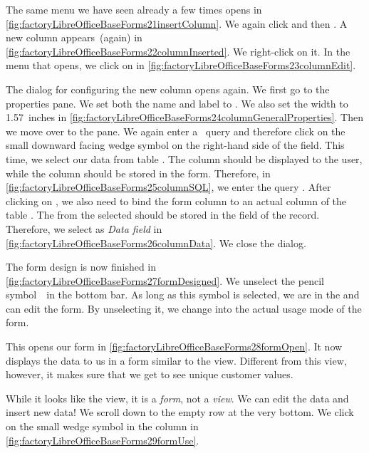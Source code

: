 The same menu we have seen already a few times opens in \cref{fig:factoryLibreOfficeBaseForms21insertColumn}.
We again click  and then .
A new  column appears~(again) in \cref{fig:factoryLibreOfficeBaseForms22columnInserted}.
We right-click on it.
In the menu that opens, we click on  in \cref{fig:factoryLibreOfficeBaseForms23columnEdit}.

The dialog for configuring the new column opens again.
We first go to the  properties pane.
We set both the name and label to .
We also set the width to 1.57~inches in \cref{fig:factoryLibreOfficeBaseForms24columnGeneralProperties}.
Then we move over to the  pane.
We again enter a \sql\ query and therefore click on the small downward facing wedge symbol on the right-hand side of the  field.
This time, we select our data from table .
The  column should be displayed to the user, while the  column should be stored in the form.
Therefore, in \cref{fig:factoryLibreOfficeBaseForms25columnSQL}, we enter the query .
After clicking on , we also need to bind the form column to an actual column of the table .
The  from the selected  should be stored in the  field of the  record.
Therefore, we select  as \emph{Data field} in \cref{fig:factoryLibreOfficeBaseForms26columnData}.
We close the dialog.

The form design is now finished in \cref{fig:factoryLibreOfficeBaseForms27formDesigned}.
We unselect the pencil symbol~\libreOfficeBaseDesignMode\ in the bottom bar.
As long as this symbol is selected, we are in the  and can edit the form.
By unselecting it, we change into the actual usage mode of the form.

This opens our form in \cref{fig:factoryLibreOfficeBaseForms28formOpen}.
It now displays the data to us in a form similar to the  view.
Different from this view, however, it makes sure that we get to see unique customer values.

While it looks like the  view, it is a \emph{form}, not a \emph{view}.
We can edit the data and insert new data!
We scroll down to the empty row at the very bottom.
We click on the small wedge symbol in the  column in \cref{fig:factoryLibreOfficeBaseForms29formUse}.

